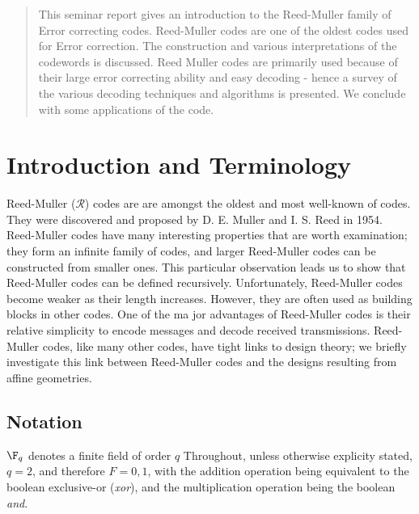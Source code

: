   

\maketitle

\begin{abstract} 
This seminar report gives an introduction to the Reed-Muller family of Error correcting codes. Reed-Muller codes are one of the oldest codes used for Error correction. The construction and various interpretations of the codewords is discussed. Reed Muller codes are primarily used because of their large error correcting ability and easy decoding - hence a survey of the various decoding techniques and algorithms is presented. We conclude with some applications of the code.
\end{abstract}


\section {Introduction and Terminology}
Reed-Muller ($\mathcal{R}$) codes are are amongst the oldest and most well-known of codes. They were discovered and proposed by D. E. Muller and I. S. Reed in 1954. 
Reed-Muller codes have many interesting properties that are worth examination; they 
form an inﬁnite family of codes, and larger Reed-Muller codes can be constructed from 
smaller ones. This particular observation leads us to show that Reed-Muller codes can be 
deﬁned recursively. 
Unfortunately, Reed-Muller codes become weaker as their length increases. However, 
they are often used as building blocks in other codes. 
One of the ma jor advantages of Reed-Muller codes is their relative simplicity to encode 
messages and decode received transmissions.  
Reed-Muller codes, like many other codes, have tight links to design theory; we brieﬂy 
investigate this link between Reed-Muller codes and the designs resulting from affine geometries. 

\subsection{Notation}
$\F _q$ denotes a finite field of order $q$
Throughout, unless otherwise explicity stated, $q=2$, and therefore $F={0,1}$, with the addition operation being equivalent to the boolean exclusive-or (\emph{xor}), and the multiplication operation being the boolean \emph{and}.

